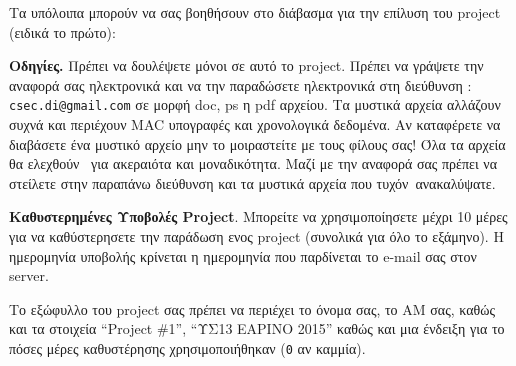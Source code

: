 \documentclass[11pt,a4paper]{article}
\begin{document}
Τα υπόλοιπα μπορούν να σας βοηθήσουν στο διάβασμα για την 
επίλυση του project (ειδικά το πρώτο):
{\small
{}
}


\noindent
{\bf Οδηγίες.}
Πρέπει να δουλέψετε μόνοι σε αυτό το project. 
Πρέπει να γράψετε την αναφορά σας ηλεκτρονικά και να την 
παραδώσετε  ηλεκτρονικά στη διεύθυνση : 
{\tt csec.di@gmail.com} σε μορφή doc, ps η pdf αρχείου.
Τα μυστικά αρχεία αλλάζουν συχνά και περιέχουν 
 MAC υπογραφές και χρονολογικά δεδομένα. 
Αν καταφέρετε να διαβάσετε ένα μυστικό αρχείο μην 
το μοιραστείτε με τους φίλους σας! Όλα τα αρχεία
θα ελεχθούν  για ακεραιότα και μοναδικότητα.
Μαζί με την αναφορά σας πρέπει να στείλετε στην παραπάνω διεύθυνση
και  τα μυστικά αρχεία που τυχόν ανακαλύψατε. 

\noindent
{\bf Καθυστερημένες Υποβολές Project}. Μπορείτε να χρησιμοποίησετε μέχρι
10 μέρες για να καθύστερησετε την παράδωση ενος project (συνολικά
για όλο το εξάμηνο). Η ημερομηνία υποβολής κρίνεται η ημερομηνία
που παρδίνεται το e-mail σας στον server. 

Το εξώφυλλο του project σας πρέπει να 
περιέχει το όνομα σας, το ΑΜ σας, καθώς και τα στοιχεία ``Project \#1'', 
``ΥΣ13 ΕΑΡΙΝΟ 2015'' καθώς και μια ένδειξη για το πόσες
μέρες καθυστέρησης χρησιμοποιήθηκαν 
 ({\tt 0} αν καμμία).
\end{document}
